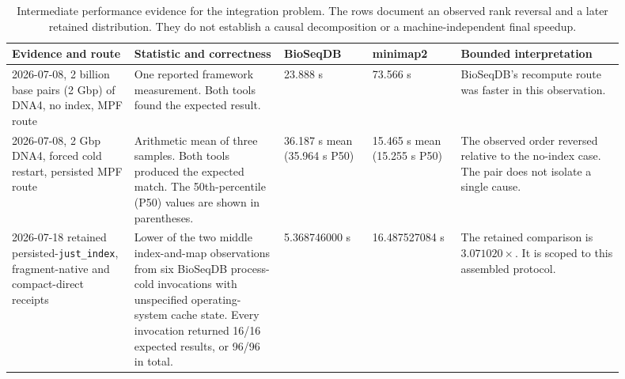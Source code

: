 \begin{table}[ht]
  \centering
  \scriptsize
  \setlength{\tabcolsep}{3pt}
  \begin{tabular}{p{0.18\linewidth}p{0.22\linewidth}p{0.13\linewidth}p{0.13\linewidth}p{0.24\linewidth}}
    \toprule
    Evidence and route & Statistic and correctness & BioSeqDB & minimap2 &
    Bounded interpretation \\
    \midrule
    2026-07-08, 2 billion base pairs (2 Gbp) of DNA4, no index, MPF route &
    One reported framework measurement.  Both tools found the expected
    result. &
    23.888 s &
    73.566 s &
    BioSeqDB's recompute route was faster in this observation. \\
    2026-07-08, 2 Gbp DNA4, forced cold restart, persisted MPF route &
    Arithmetic mean of three samples.  Both tools produced the expected
    match.  The 50th-percentile (P50) values are shown in parentheses. &
    36.187 s mean
    \newline (35.964 s P50) &
    15.465 s mean
    \newline (15.255 s P50) &
    The observed order reversed relative to the no-index case.  The pair
    does not isolate a single cause. \\
    2026-07-18 retained persisted-\texttt{just\_index},
    fragment-native and compact-direct receipts &
    Lower of the two middle index-and-map observations from six BioSeqDB
    process-cold invocations with unspecified operating-system cache state.
    Every invocation returned
    16/16 expected results, or 96/96 in total. &
    5.368746000 s &
    16.487527084 s &
    The retained comparison is \(3.071020\times\).  It is scoped to this
    assembled protocol. \\
    \bottomrule
  \end{tabular}
  \caption{Intermediate performance evidence for the integration problem.
    The rows document an observed rank reversal and a later retained
    distribution.  They do not establish a causal decomposition or a
    machine-independent final speedup.}
  \label{tab:integration-evidence}
\end{table}

